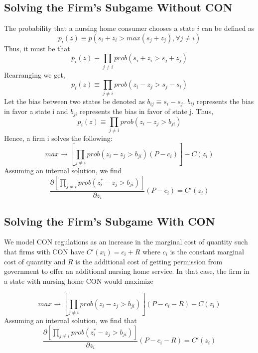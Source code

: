 \documentclass[../Main.tex]{subfiles}
\begin{document}
\subsection{Solving the Firm's Subgame Without CON}
The probability that a nursing home consumer chooses a state $i$ can be defined as \begin{equation}p_i(z) \equiv p(s_i + z_i > max(s_j + z_j), \forall j \neq i )\end{equation}
Thus, it must be that \begin{equation}p_i(z) \equiv \prod_{j\neq i} prob(s_i + z_i > s_j + z_j) \end{equation} 
Rearranging we get,
 \begin{equation}p_i(z) \equiv \prod_{j\neq i} prob(z_i-z_j > s_j - s_i) \end{equation} 
Let the bias between two states be denoted as $b_{ij} \equiv s_i - s_j $. $b_{ij}$ represents the bias in favor a state i and $b_{ji}$ represents the bias in favor of state j. Thus,\begin{equation}p_i(z) \equiv \prod_{j\neq i} prob(z_i -z_j > b_{ji}) \end{equation}  
Hence, a firm i solves the following:\begin{equation}max \rightarrow [\prod_{j\neq i} prob(z_i -z_j > b_{ji})(P-c_i)] - C(z_i)\end{equation}
Assuming an internal solution, we find 
 \begin{equation}\frac{\partial [\prod_{j\neq i} prob(z_i^* -z_j > b_{ji})]}{\partial z_i}(P-c_i) = C'(z_i) \end{equation}

\subsection{Solving the Firm's Subgame With CON}

We model CON regulations as an increase in the marginal cost of quantity such that firms with CON have $C'(x_i) = c_i + R$ where $c_i$ is the constant marginal cost of quantity  and $R$ is the additional cost of getting permission from government to offer an additional nursing home service. In that case, the firm in a state with nursing home CON would maximize

\begin{equation} max \rightarrow [\prod_{j\neq i} prob(z_i -z_j > b_{ji})](P - c_i - R) - C(z_i) \end{equation}
Assuming an internal solution, we find that
 \begin{equation}\frac{\partial [\prod_{j\neq i} prob(z_i^* - z_j > b_{ji})]}{\partial z_i}(P - c_i - R) = C'(z_i) \end{equation}
\end{document}

